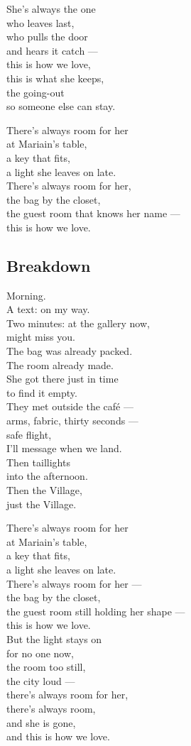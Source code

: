 \begin{lyrics}
She's always the one\\
who leaves last,\\
who pulls the door\\
and hears it catch —\\
this is how we love,\\
this is what she keeps,\\
the going-out\\
so someone else can stay.

There's always room for her\\
at Mariain's table,\\
a key that fits,\\
a light she leaves on late.\\
There's always room for her,\\
the bag by the closet,\\
the guest room that knows her name —\\
this is how we love.

\subsection{Breakdown}
Morning.\\
A text: on my way.\\
Two minutes: at the gallery now,\\
might miss you.\\
The bag was already packed.\\
The room already made.\\
She got there just in time\\
to find it empty.\\
They met outside the café —\\
arms, fabric, thirty seconds —\\
safe flight,\\
I'll message when we land.\\
Then taillights\\
into the afternoon.\\
Then the Village,\\
just the Village.

There's always room for her\\
at Mariain's table,\\
a key that fits,\\
a light she leaves on late.\\
There's always room for her —\\
the bag by the closet,\\
the guest room still holding her shape —\\
this is how we love.\\
But the light stays on\\
for no one now,\\
the room too still,\\
the city loud —\\
there's always room for her,\\
there's always room,\\
and she is gone,\\
and this is how we love.

\end{lyrics}


